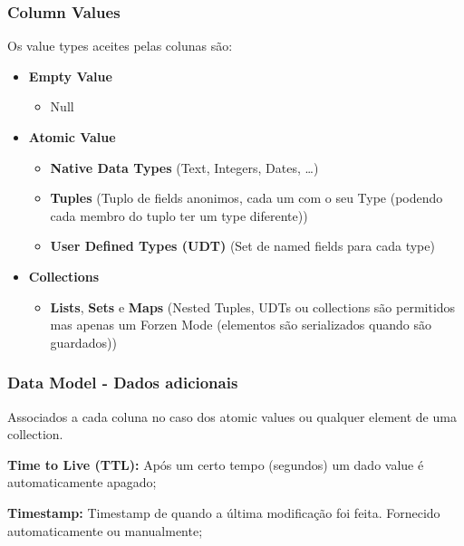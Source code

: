\documentclass{article}
\begin{document}
\subsubsection{Column Values}
\begin{flushleft}
  Os value types aceites pelas colunas são:
  \begin{itemize}
    \item \textbf{Empty Value}
    \begin{itemize}
      \item Null
    \end{itemize}
    \item \textbf{Atomic Value}
    \begin{itemize}
      \item \textbf{Native Data Types} (Text, Integers, Dates, \dots)
      \item \textbf{Tuples} (Tuplo de fields anonimos, cada um com o seu Type
      (podendo cada membro do tuplo ter um type diferente))
      \item \textbf{User Defined Types (UDT)} (Set de named fields para cada type)
    \end{itemize}
    \item \textbf{Collections}
    \begin{itemize}
      \item \textbf{Lists}, \textbf{Sets} e \textbf{Maps} (Nested Tuples, UDTs ou collections são
      permitidos mas apenas um Forzen Mode (elementos são serializados quando
      são guardados))
    \end{itemize}
  \end{itemize}
\end{flushleft}

\subsubsection{Data Model - Dados adicionais}

Associados a cada coluna no caso dos atomic values ou qualquer element de uma
collection.

\begin{flushleft}
  \textbf{Time to Live (TTL):} Após um certo tempo (segundos) um dado value é automaticamente apagado;

  \vspace{2mm}

  \textbf{Timestamp:} Timestamp de quando a última modificação foi feita. Fornecido
  automaticamente ou manualmente;
\end{flushleft}
\end{document}
